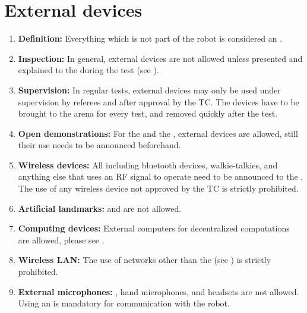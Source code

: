 \section{External devices}\label{rule:roobt_external_devices}
\begin{enumerate}
	\item \textbf{Definition:} Everything which is not part of the robot is considered an . 
	\item \textbf{Inspection:} In general, external devices are not allowed unless presented and explained to the  during the  test (see ).
	\item \textbf{Supervision:} In regular tests, external devices may only be used under supervision by referees and after approval by the TC. The devices have to be brought to the arena for every test, and removed quickly after the test.
	\item \textbf{Open demonstrations:} For the  and the , external devices are allowed, still their use needs to be announced beforehand.
	\item \textbf{Wireless devices:} All  including bluetooth devices, walkie-talkies, and anything else that uses an RF signal to operate need to be announced to the . The use of any wireless device not approved by the TC is strictly prohibited.  
	\item \textbf{Artificial landmarks:}  and  are not allowed.
	\item \textbf{Computing devices:} External computers for decentralized computations are allowed, please see .
	\item \textbf{Wireless LAN:} The use of networks other than the  (see ) is strictly prohibited.
	\item \textbf{External microphones: }, hand microphones, and headsets are not allowed. Using an  is mandatory for communication with the robot.
\end{enumerate}


